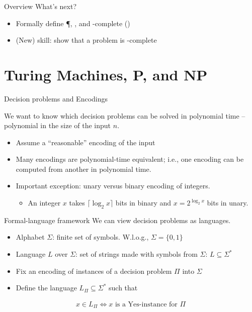 \begin{frame}{Overview}
	What's next?
	\begin{itemize}
		\item Formally define \P, \NP, and \NP-complete (\NPC)
		\item (New) skill: show that a problem is \NP-complete
	\end{itemize}
\end{frame}


\section{Turing Machines, P, and NP}

\begin{frame}{Decision problems and Encodings}

	\pause
	We want to know which decision problems can be solved in polynomial time -- polynomial in the \alert{size of the input} $n$.
	\begin{itemize}
		\item Assume a ``reasonable'' encoding of the input
		\item Many encodings are polynomial-time equivalent; i.e., one encoding can be computed from another in polynomial time.
		\item Important exception: unary versus binary encoding of integers.
		      \begin{itemize}
			      \item An integer $x$ takes $\lceil \log_2 x \rceil$ bits in binary and $x = 2^{\log_2 x}$ bits in unary.
		      \end{itemize}
	\end{itemize}
\end{frame}


\begin{frame}{Formal-language framework}
	We can view decision problems as languages.
	\begin{itemize}
		\item Alphabet $\Sigma$: finite set of symbols. W.l.o.g., $\Sigma=\{0,1\}$
		\item Language $L$ over $\Sigma$: set of strings made with symbols from $\Sigma$: $L \subseteq \Sigma^*$
		\item Fix an encoding of instances of a decision problem $\Pi$ into $\Sigma$
		\item Define the language $L_{\Pi} \subseteq \Sigma^*$ such that
	\end{itemize}
	\begin{align*}
		x\in L_{\Pi} \Leftrightarrow x \text{ is a Yes-instance for } \Pi
	\end{align*}
\end{frame}


